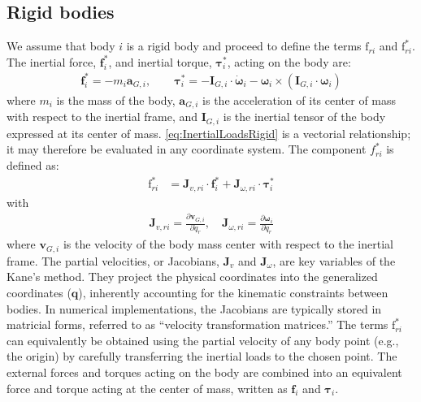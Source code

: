 \documentclass[wes, manuscript]{copernicus}
\renewcommand{\v}[1]{\boldsymbol{#1}}
\newcommand{\m}[1]{\boldsymbol{#1}}
\newcommand{\kanef}{\mathrm{f}}
\begin{document}
\subsection{Rigid bodies}
\label{sec:rigidbodies}
We assume that body $i$ is a rigid body and proceed to define the terms $\kanef_{ri}$ and $\kanef_{ri}^*$.
The inertial force, $\v{f}_i^*$, and inertial torque, $\v{\tau}_i^*$, acting on the body are:
\begin{align}
     \v{f}_i^* = - m_i \v{a}_{G,i},
         \qquad
     \v{\tau}_i^* = -\m{I}_{G,i} \cdot \v{\dot{\omega}}_i - \v{\omega} _i \times( \m{I}_{G,i}\cdot \v{\omega}_i)
      \label{eq:InertialLoadsRigid}
\end{align}
where $m_i$ is the mass of the body, $\v{a}_{G,i}$ is the acceleration of its center of mass with respect to the inertial frame, and $\m{I}_{G,i}$ is the inertial tensor of the body expressed at its center of mass. 
\autoref{eq:InertialLoadsRigid} is a vectorial relationship; it may therefore be evaluated in any coordinate system.
The component $f_{ri}^*$ is defined as:
\begin{align}
   \kanef_{ri}^* &= \v{J}_{v,ri} \cdot \v{f}_i^*  + \v{J}_{\omega,ri} \cdot \v{\tau}_i^*
    \label{eq:frstarRigid}
\end{align}
with
\begin{align}
    \v{J}_{v,ri} = \frac{\partial \v{v}_{G,i}}{\partial \dot{q}_r}
    ,\quad
    \v{J}_{\omega,ri} = \frac{\partial \v{\omega}_{i}}{\partial \dot{q}_r}
\end{align}
where $\v{v}_{G,i}$ is the velocity of the body mass center with respect to the inertial frame.
The partial velocities, or Jacobians, $\v{J}_v$ and $\v{J}_\omega$, are key variables of the Kane's method.
They project the physical coordinates into the generalized coordinates ($\v{q}$), inherently accounting for the kinematic constraints between bodies.
In numerical implementations, the Jacobians are typically stored in matricial forms, referred to as ``velocity transformation matrices.''
The terms $\kanef_{ri}^*$ can equivalently be obtained using the partial velocity of any body point (e.g., the origin) by carefully transferring the inertial loads to the chosen point.
The external forces and torques acting on the body are combined into an equivalent force and torque acting at the center of mass, written as $\v{f}_i$  and $\v{\tau}_i$. 
\end{document}
